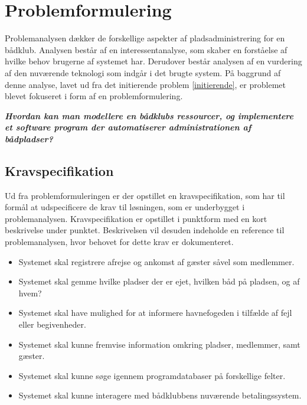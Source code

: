 \chapter{Problemformulering}
\label{cha:problemformulering}


Problemanalysen dækker de forskellige aspekter af pladsadministrering for en bådklub. Analysen består af en interessentanalyse, som skaber en forståelse af hvilke behov brugerne af systemet har. Derudover består analysen af en vurdering af den nuværende teknologi som indgår i det brugte system. På baggrund af denne analyse, lavet ud fra det initierende problem \ref{initierende}, er problemet blevet fokuseret i form af en problemformulering.


\begin{displayquote}
	\textbf{\textit{Hvordan kan man modellere en bådklubs ressourcer, og implementere et software program der automatiserer administrationen af bådpladser?}}
\end{displayquote}

\section{Kravspecifikation} %
\label{sec:Kravspecifikation}

Ud fra problemformuleringen er der opstillet en kravspecifikation, som har til
formål at udspecificere de krav til løsningen, som er underbygget i problemanalysen. 
Kravspecifikation er opstillet i punktform med en kort beskrivelse 
under punktet. Beskrivelsen vil desuden indeholde en reference til problemanalysen, hvor 
behovet for dette krav er dokumenteret.
 

\begin{itemize}
  \item Systemet skal registrere afrejse og ankomst af gæster såvel som medlemmer.
  \item Systemet skal gemme hvilke pladser der er ejet, hvilken båd på pladsen, og af hvem?
  \item Systemet skal have mulighed for at informere havnefogeden i tilfælde af fejl eller begivenheder.
  \item Systemet skal kunne fremvise information omkring pladser, medlemmer, samt gæster.
  \item Systemet skal kunne søge igennem programdatabaser på forskellige felter.	
  \item Systemet skal kunne interagere med bådklubbens nuværende betalingssystem.
\end{itemize}


